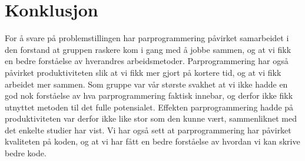 \section{Konklusjon}

For å svare på problemstillingen har parprogrammering påvirket samarbeidet i den forstand at gruppen raskere kom i gang med å jobbe sammen, og at vi fikk en bedre forståelse av hverandres arbeidsmetoder.
Parprogrammering har også påvirket produktiviteten slik at vi fikk mer gjort på kortere tid, og at vi fikk arbeidet mer sammen.
Som gruppe var vår største svakhet at vi ikke hadde en god nok forståelse av hva parprogrammering faktisk innebar, og derfor ikke fikk utnyttet metoden til det fulle potensialet.
Effekten parprogrammering hadde på produktiviteten var derfor ikke like stor som den kunne vært, sammenliknet med det enkelte studier har vist.
Vi har også sett at parprogrammering har påvirket kvaliteten på koden, og at vi har fått en bedre forståelse av hvordan vi kan skrive bedre kode.
